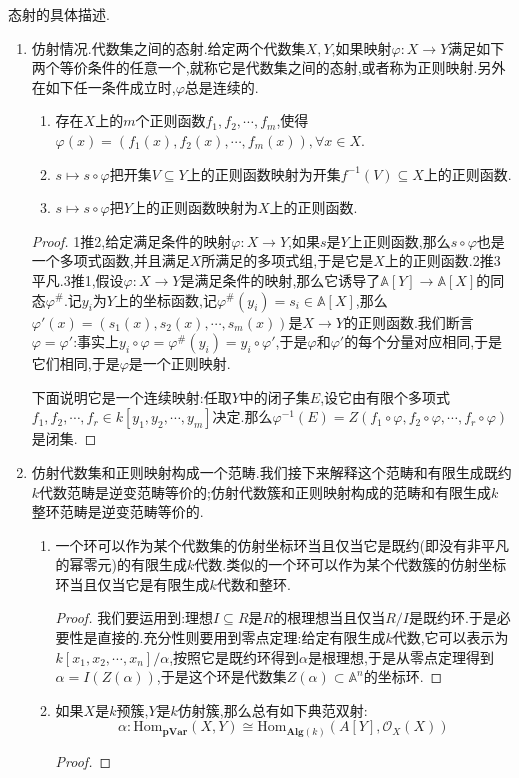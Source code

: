 态射的具体描述.
\begin{enumerate}
	\item 仿射情况.代数集之间的态射.给定两个代数集$X,Y$,如果映射$\varphi:X\to Y$满足如下两个等价条件的任意一个,就称它是代数集之间的态射,或者称为正则映射.另外在如下任一条件成立时,$\varphi$总是连续的.
	\begin{enumerate}
		\item 存在$X$上的$m$个正则函数$f_1,f_2,\cdots,f_m$,使得$\varphi(x)=(f_1(x),f_2(x),\cdots,f_m(x)),\forall x\in X$.
		\item $s\mapsto s\circ\varphi$把开集$V\subseteq Y$上的正则函数映射为开集$f^{-1}(V)\subseteq X$上的正则函数.
		\item $s\mapsto s\circ\varphi$把$Y$上的正则函数映射为$X$上的正则函数.
	\end{enumerate}
	\begin{proof}
		
		1推2,给定满足条件的映射$\varphi:X\to Y$,如果$s$是$Y$上正则函数,那么$s\circ\varphi$也是一个多项式函数,并且满足$X$所满足的多项式组,于是它是$X$上的正则函数.2推3平凡.3推1,假设$\varphi:X\to Y$是满足条件的映射,那么它诱导了$\mathbb{A}[Y]\to\mathbb{A}[X]$的同态$\varphi^{\#}$.记$y_i$为$Y$上的坐标函数,记$\varphi^{\#}(y_i)=s_i\in\mathbb{A}[X]$,那么$\varphi'(x)=(s_1(x),s_2(x),\cdots,s_m(x))$是$X\to Y$的正则函数.我们断言$\varphi=\varphi'$:事实上$y_i\circ\varphi=\varphi^{\#}(y_i)=y_i\circ\varphi'$,于是$\varphi$和$\varphi'$的每个分量对应相同,于是它们相同,于是$\varphi$是一个正则映射.
		
		下面说明它是一个连续映射:任取$Y$中的闭子集$E$,设它由有限个多项式$f_1,f_2,\cdots,f_r\in k[y_1,y_2,\cdots,y_m]$决定.那么$\varphi^{-1}(E)=Z(f_1\circ\varphi,f_2\circ\varphi,\cdots,f_r\circ\varphi)$是闭集.
	\end{proof}
    \item 仿射代数集和正则映射构成一个范畴.我们接下来解释这个范畴和有限生成既约$k$代数范畴是逆变范畴等价的;仿射代数簇和正则映射构成的范畴和有限生成$k$整环范畴是逆变范畴等价的.
    \begin{enumerate}
    	\item 一个环可以作为某个代数集的仿射坐标环当且仅当它是既约(即没有非平凡的幂零元)的有限生成$k$代数.类似的一个环可以作为某个代数簇的仿射坐标环当且仅当它是有限生成$k$代数和整环.
    	\begin{proof}
    		
    		我们要运用到:理想$I\subseteq R$是$R$的根理想当且仅当$R/I$是既约环.于是必要性是直接的.充分性则要用到零点定理:给定有限生成$k$代数,它可以表示为$k[x_1,x_2,\cdots,x_n]/\alpha$,按照它是既约环得到$\alpha$是根理想,于是从零点定理得到$\alpha=I(Z(\alpha))$,于是这个环是代数集$Z(\alpha)\subset\mathbb{A}^n$的坐标环.
    	\end{proof}
    	\item 如果$X$是$k$预簇,$Y$是$k$仿射簇,那么总有如下典范双射:
    	$$\alpha:\mathrm{Hom}_{\textbf{pVar}}(X,Y)\cong\mathrm{Hom}_{\textbf{Alg}(k)}(A[Y],\mathscr{O}_X(X))$$
    	\begin{proof}
    		

\end{proof}
\end{enumerate}
\end{enumerate}
